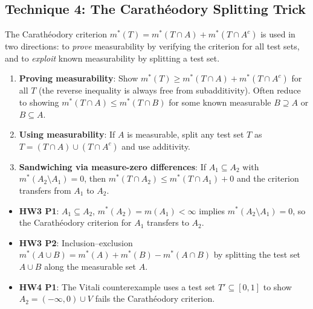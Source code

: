 \documentclass[11pt]{report}
\begin{document}
\subsection{Technique 4: The Carath\'eodory Splitting Trick}

The Carath\'eodory criterion $m^*(T) = m^*(T \cap A) + m^*(T \cap A^c)$ is used in two directions: to \textit{prove} measurability by verifying the criterion for all test sets, and to \textit{exploit} known measurability by splitting a test set.

\begin{rembox}[Strategy]
\begin{enumerate}[label=(\roman*)]
\item \textbf{Proving measurability}: Show $m^*(T) \geq m^*(T \cap A) + m^*(T \cap A^c)$ for all $T$ (the reverse inequality is always free from subadditivity). Often reduce to showing $m^*(T \cap A) \leq m^*(T \cap B)$ for some known measurable $B \supseteq A$ or $B \subseteq A$.
\item \textbf{Using measurability}: If $A$ is measurable, split any test set $T$ as $T = (T \cap A) \cup (T \cap A^c)$ and use additivity.
\item \textbf{Sandwiching via measure-zero differences}: If $A_1 \subseteq A_2$ with $m^*(A_2 \setminus A_1) = 0$, then $m^*(T \cap A_2) \leq m^*(T \cap A_1) + 0$ and the criterion transfers from $A_1$ to $A_2$.
\end{enumerate}
\end{rembox}

\begin{exbox}
\begin{itemize}
\item \textbf{HW3 P1}: $A_1 \subseteq A_2$, $m^*(A_2) = m(A_1) < \infty$ implies $m^*(A_2 \setminus A_1) = 0$, so the Carath\'eodory criterion for $A_1$ transfers to $A_2$.
\item \textbf{HW3 P2}: Inclusion--exclusion $m^*(A \cup B) = m^*(A) + m^*(B) - m^*(A \cap B)$ by splitting the test set $A \cup B$ along the measurable set $A$.
\item \textbf{HW4 P1}: The Vitali counterexample uses a test set $T' \subseteq [0,1]$ to show $A_2 = (-\infty,0) \cup V$ fails the Carath\'eodory criterion.
\end{itemize}
\end{exbox}

\end{document}
